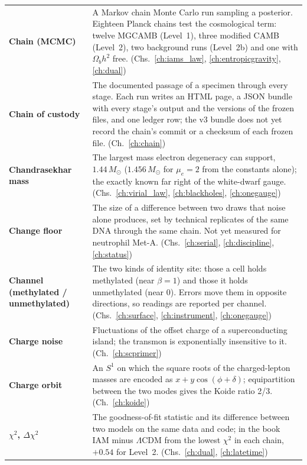 {\begin{longtable}{@{}>{\raggedright\arraybackslash}p{}>{\raggedright\arraybackslash}p{}@{}}
\textbf{Chain (MCMC)} & A Markov chain Monte Carlo run sampling a posterior. Eighteen Planck chains test the cosmological term: twelve MGCAMB (Level~1), three modified CAMB (Level~2), two background runs (Level~2b) and one with $\Omega_bh^2$ free. {\footnotesize(Chs.~\ref{ch:iams_law}, \ref{ch:entropicgravity}, \ref{ch:dual})}\\[1pt]
\textbf{Chain of custody} & The documented passage of a specimen through every stage. Each run writes an HTML page, a JSON bundle with every stage's output and the versions of the frozen files, and one ledger row; the v3 bundle does not yet record the chain's commit or a checksum of each frozen file. {\footnotesize(Ch.~\ref{ch:chain})}\\[1pt]
\textbf{Chandrasekhar mass} & The largest mass electron degeneracy can support, $1.44\,M_\odot$ ($1.456\,M_\odot$ for $\mu_e=2$ from the constants alone); the exactly known far right of the white-dwarf gauge. {\footnotesize(Chs.~\ref{ch:virial_law}, \ref{ch:blackholes}, \ref{ch:onegauge})}\\[1pt]
\textbf{Change floor} & The size of a difference between two draws that noise alone produces, set by technical replicates of the same DNA through the same chain. Not yet measured for neutrophil Met-A. {\footnotesize(Chs.~\ref{ch:serial}, \ref{ch:discipline}, \ref{ch:status})}\\[1pt]
\textbf{Channel (methylated / unmethylated)} & The two kinds of identity site: those a cell holds methylated (near $\beta=1$) and those it holds unmethylated (near 0). Errors move them in opposite directions, so readings are reported per channel. {\footnotesize(Chs.~\ref{ch:surface}, \ref{ch:instrument}, \ref{ch:onegauge})}\\[1pt]
\textbf{Charge noise} & Fluctuations of the offset charge of a superconducting island; the transmon is exponentially insensitive to it. {\footnotesize(Ch.~\ref{ch:scprimer})}\\[1pt]
\textbf{Charge orbit} & An $S^1$ on which the square roots of the charged-lepton masses are encoded as $x+y\cos(\phi+\delta)$; equipartition between the two modes gives the Koide ratio 2/3. {\footnotesize(Ch.~\ref{ch:koide})}\\[1pt]
\textbf{$\chi^2$, $\Delta\chi^2$} & The goodness-of-fit statistic and its difference between two models on the same data and code; in the book IAM minus $\Lambda$CDM from the lowest $\chi^2$ in each chain, $+0.54$ for Level~2. {\footnotesize(Chs.~\ref{ch:dual}, \ref{ch:latetime})}\\[1pt]

\end{longtable}}
